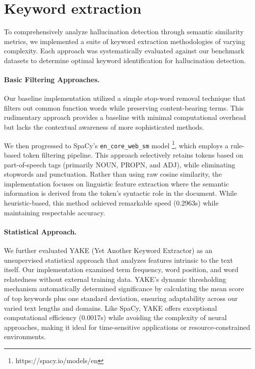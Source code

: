 \documentclass[sigconf]{acmart}
\begin{document}
\section{Keyword extraction}
To comprehensively analyze hallucination detection through semantic similarity metrics, we implemented a suite of keyword extraction methodologies of varying complexity. Each approach was systematically evaluated against our benchmark datasets to determine optimal keyword identification for hallucination detection.

\paragraph{Basic Filtering Approaches.}
Our baseline implementation utilized a simple stop-word removal technique that filters out common function words while preserving content-bearing terms. This rudimentary approach provides a baseline with minimal computational overhead but lacks the contextual awareness of more sophisticated methods. 

We then progressed to SpaCy's \texttt{en\_core\_web\_sm} model \footnote{https://spacy.io/models/en}, which employs a rule-based token filtering pipeline. This approach selectively retains tokens based on part-of-speech tags (primarily NOUN, PROPN, and ADJ), while eliminating stopwords and punctuation. Rather than using raw cosine similarity, the implementation focuses on linguistic feature extraction where the semantic information is derived from the token's syntactic role in the document. While heuristic-based, this method achieved remarkable speed (0.2963s) while maintaining respectable accuracy.

\paragraph{Statistical Approach.}
We further evaluated YAKE (Yet Another Keyword Extractor) \cite{DBLP:conf/ecir/0001MPJNJ18a} as an unsupervised statistical approach that analyzes features intrinsic to the text itself. Our implementation examined term frequency, word position, and word relatedness without external training data. YAKE's dynamic thresholding mechanism automatically determined significance by calculating the mean score of top keywords plus one standard deviation, ensuring adaptability across our varied text lengths and domains. Like SpaCy, YAKE offers exceptional computational efficiency (0.0017s) while avoiding the complexity of neural approaches, making it ideal for time-sensitive applications or resource-constrained environments.
\end{document}
